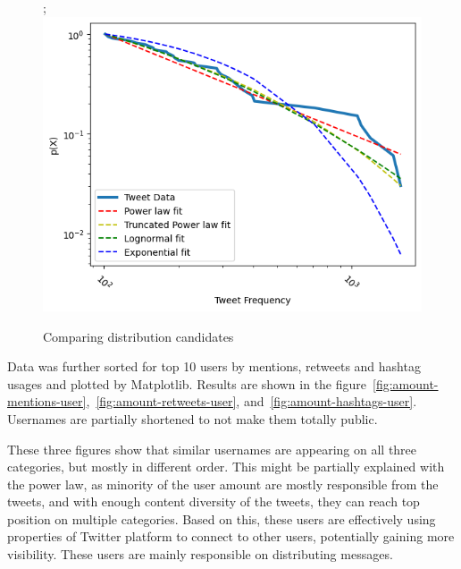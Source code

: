 \documentclass[conference]{IEEEtran}
\begin{document}
\begin{figure};
\includegraphics[scale=0.5]{figures/amount_tweets_powerlaw}
\caption{Comparing distribution candidates}
\label{fig:amount-tweets-powerlaw}
\end{figure}

Data was further sorted for top 10 users by mentions, retweets and hashtag usages and plotted by Matplotlib.
Results are shown in the figure~\ref{fig:amount-mentions-user},~\ref{fig:amount-retweets-user}, and~\ref{fig:amount-hashtags-user}.
Usernames are partially shortened to not make them totally public.

These three figures show that similar usernames are appearing on all three categories, but mostly in different order.
This might be partially explained with the power law, as minority of the user amount are mostly responsible from the tweets,
and with enough content diversity of the tweets, they can reach top position on multiple categories.
Based on this, these users are effectively using properties of Twitter platform to connect to other users, potentially gaining more visibility.
These users are mainly responsible on distributing messages.
\end{document}

